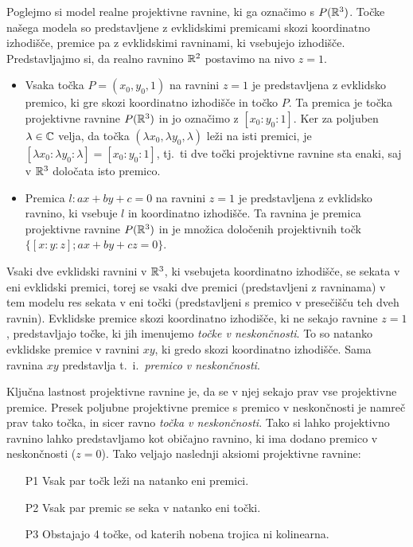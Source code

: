 Poglejmo si model realne projektivne ravnine, ki ga označimo s $P(\mathbb R^3)$. Točke našega modela so predstavljene z evklidskimi premicami skozi koordinatno izhodišče, premice pa z evklidskimi ravninami, ki vsebujejo izhodišče. Predstavljajmo si, da realno ravnino $\mathbb R^2$ postavimo na nivo $z = 1$.
\begin{itemize}
    \item Vsaka točka $P = (x_0, y_0, 1)$ na ravnini $z = 1$ je predstavljena z evklidsko premico, ki gre skozi koordinatno izhodišče in točko $P$. Ta premica je točka projektivne ravnine $P(\mathbb R^3)$ in jo označimo z $[x_0 : y_0 : 1]$. Ker za poljuben $\lambda \in \mathbb C$ velja, da točka $(\lambda x_0, \lambda y_0, \lambda)$ leži na isti premici, je $[\lambda x_0 : \lambda y_0 : \lambda] = [x_0 : y_0 : 1]$, tj.\ ti dve točki projektivne ravnine sta enaki, saj v $\mathbb R^3$ določata isto premico.
    \item Premica $l: ax + by + c = 0$ na ravnini $z = 1$ je predstavljena z evklidsko ravnino, ki vsebuje $l$ in koordinatno izhodišče. Ta ravnina je premica projektivne ravnine $P(\mathbb R^3)$ in je množica določenih projektivnih točk $\{ [x:y:z]; ax+by+cz = 0\}$.
\end{itemize}
Vsaki dve evklidski ravnini v $\mathbb R^3$, ki vsebujeta koordinatno izhodišče, se sekata v eni evklidski premici, torej se vsaki dve premici (predstavljeni z ravninama) v tem modelu res sekata v eni točki (predstavljeni s premico v presečišču teh dveh ravnin). Evklidske premice skozi koordinatno izhodišče, ki ne sekajo ravnine $z = 1$, predstavljajo točke, ki jih imenujemo \emph{točke v neskončnosti}. To so natanko evklidske premice v ravnini $xy$, ki gredo skozi koordinatno izhodišče. Sama ravnina $xy$ predstavlja t.~i.\ \emph{premico v neskončnosti}.

Ključna lastnost projektivne ravnine je, da se v njej sekajo prav vse projektivne premice. Presek poljubne projektivne premice s premico v neskončnosti je namreč prav tako točka, in sicer ravno \emph{točka v neskončnosti}. Tako si lahko projektivno ravnino lahko predstavljamo kot običajno ravnino, ki ima dodano premico v neskončnosti ($z = 0$). Tako veljajo naslednji aksiomi projektivne ravnine:
\begin{itemize}
    \item [P1] Vsak par točk leži na natanko eni premici.
    \item [P2] Vsak par premic se seka v natanko eni točki.
    \item [P3] Obstajajo 4 točke, od katerih nobena trojica ni kolinearna.
\end{itemize}

